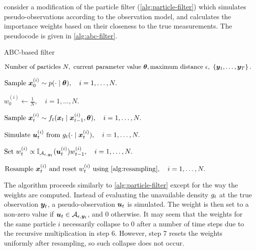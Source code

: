 \cite{jasra-filtering} consider a modification of the particle filter (\autoref{alg:particle-filter}) which simulates pseudo-observations according to the observation model, and calculates the importance weights based on their closeness to the true measurements. The pseudocode is given in \autoref{alg:abc-filter}.

\begin{algorithm}[ht]
    \caption{ABC-based filter}
    \label{alg:abc-filter}
    \begin{algorithmic}[1]
        \Input $\text{Number of particles } N,\ \text{current parameter value } \btheta, \text{maximum distance } \epsilon,\ \left\{\by_1, \ldots, \by_T\right\}.$
        
        \State $\text{Sample } \bm{x}_0^{(i)} \sim p(\cdot \mid \bm{\theta}), \quad i = 1, \ldots, N.$ 
        
        \State $w_0^{(i)} \gets \frac{1}{N}, \quad i = 1, \ldots, N.$ 
        
        \State $\text{Sample } \bm{x}_t^{(i)} \sim f_t(\bm{x}_t \mid \bm{x}_{t-1}^{(i)}, \bm{\theta}), \quad i = 1, \ldots, N.$ 
        
        \State $\text{Simulate } \bm{u}_t^{(i)} \text{ from } g_t(\cdot \mid \bm{x}_t^{(i)}), \quad i = 1, \ldots, N.$ 
        
        \State $\text{Set } w_t^{(i)} \propto \mathbb{I}_{\mathcal{A}_{\epsilon, \bm{y}_t}}(\bm{u}_t^{(i)}) w_{t-1}^{(i)}, \quad i = 1, \ldots, N.$
        
        \State $\text{Resample } \bx_t^{(i)} \text{ and reset } w_t^{(i)} \text{ using \autoref{alg:resampling}}, \quad i = 1, \ldots, N.$
        \EndFor
    \end{algorithmic}
\end{algorithm}

The algorithm proceeds similarly to \autoref{alg:particle-filter} except for the way the weights are computed. Instead of evaluating the unavailable density $g_t$ at the true observation $\bm{y}_t$, a pseudo-observation $\bm{u}_t$ is simulated. The weight is then set to a non-zero value if ${\bm{u}_t \in \mathcal{A}_{\epsilon, \bm{y}_t}}$, and 0 otherwise. It may seem that the weights for the same particle $i$ necessarily collapse to 0 after a number of time steps due to the recursive multiplication in step 6. However, step 7 resets the weights uniformly after resampling, so such collapse does not occur.

